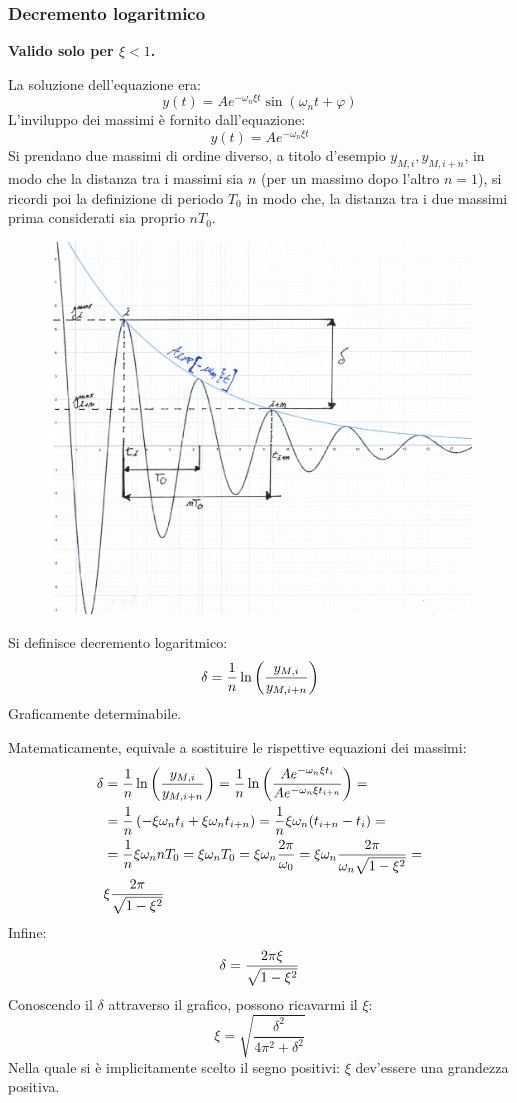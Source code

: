 \documentclass[a4paper, 15pt]{article}
\begin{document}
\subsubsection{Decremento logaritmico}	
\begin{adjustwidth}{2in}{} 	
	\textbf{Valido solo per $\xi<1$.} 
	
	La soluzione dell'equazione era: 
	\[ y(t) = Ae^{-\omega_n\xi t}\sin(\omega_nt + \varphi)\]
	L'inviluppo dei massimi è fornito dall'equazione:
	\[ y(t) =  Ae^{-\omega_n\xi t} \]	
	Si prendano due massimi di ordine diverso, a titolo d'esempio $y_{M,i}, y_{M,i+n}$, in modo che la distanza tra i massimi sia $n$ (per un massimo dopo l'altro $n=1$), si ricordi poi la definizione di periodo $T_0$ in modo che, la distanza tra i due massimi prima considerati sia proprio $nT_0$. 
\begin{figure}[H]
	\centering
	\includegraphics[width=0.5\linewidth]{fig/mm13}
	\label{fig:mm13}
\end{figure}	
	Si definisce decremento logaritmico:
	\[ \delta = {1\over n}\ln\left(\dfrac{y_{M,i}}{y_{M,i+n}}\right)\]
	Graficamente determinabile. \newline 
	
	Matematicamente, equivale a sostituire le rispettive equazioni dei massimi:
	\[ \begin{split}
		\delta & = {1\over n}\ln\left(\dfrac{y_{M,i}}{y_{M,i+n}}\right) =  {1\over n}\ln\left(   \dfrac{Ae^{-\omega_n\xi t_i}}{Ae^{-\omega_n\xi t_{i+n}}}\right) = \\ 
		& = {1\over n}\left(-\xi\omega_nt_i + \xi\omega_nt_{i+n} \right) = {1\over n}\xi\omega_n(t_{i+n} -t_i ) = \\
		& ={1\over n}\xi\omega_n nT_0 = \xi\omega_nT_0 = \xi\omega_n{2\pi\over\omega_0} = \xi\omega_n{2\pi\over \omega_n\sqrt{1 - \xi^2}} = \\
		& \xi{2\pi\over \sqrt{1 - \xi^2}}
	\end{split}\]
	Infine:
	\[ \delta = {2\pi\xi\over \sqrt{1 - \xi^2}} \]
	Conoscendo il $\delta$ attraverso il grafico, possono ricavarmi il $\xi$:
	\[ \xi = \sqrt{\dfrac{\delta^2}{4\pi^2 + \delta^2}}\]
	Nella quale si è implicitamente scelto il segno positivi: $\xi$ dev'essere una grandezza positiva. \newline 
	

\end{adjustwidth}
\end{document}
